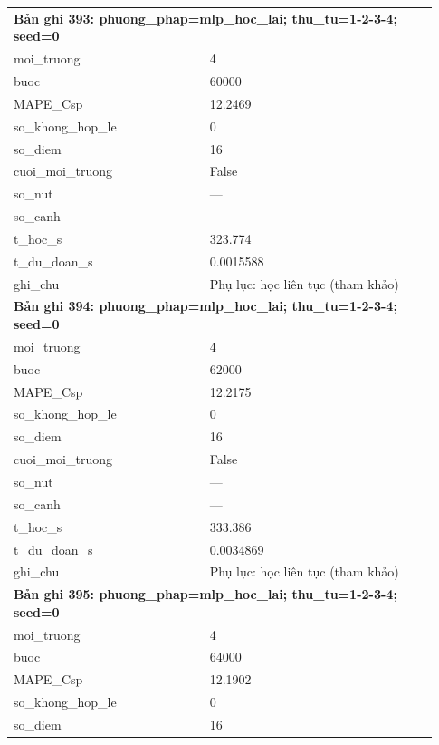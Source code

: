 \begin{longtable}{p{0.43\linewidth}p{0.50\linewidth}}
\midrule
\multicolumn{2}{p{0.95\linewidth}}{\textbf{Bản ghi 393: phuong\_phap=mlp\_hoc\_lai; thu\_tu=1-2-3-4; seed=0}} \\
moi\_\allowbreak truong & 4 \\
buoc & 60000 \\
MAPE\_\allowbreak Csp & 12.2469 \\
so\_\allowbreak khong\_\allowbreak hop\_\allowbreak le & 0 \\
so\_\allowbreak diem & 16 \\
cuoi\_\allowbreak moi\_\allowbreak truong & False \\
so\_\allowbreak nut & — \\
so\_\allowbreak canh & — \\
t\_\allowbreak hoc\_\allowbreak s & 323.774 \\
t\_\allowbreak du\_\allowbreak doan\_\allowbreak s & 0.0015588 \\
ghi\_\allowbreak chu & Phụ lục: học liên tục (tham khảo) \\
\midrule
\multicolumn{2}{p{0.95\linewidth}}{\textbf{Bản ghi 394: phuong\_phap=mlp\_hoc\_lai; thu\_tu=1-2-3-4; seed=0}} \\
moi\_\allowbreak truong & 4 \\
buoc & 62000 \\
MAPE\_\allowbreak Csp & 12.2175 \\
so\_\allowbreak khong\_\allowbreak hop\_\allowbreak le & 0 \\
so\_\allowbreak diem & 16 \\
cuoi\_\allowbreak moi\_\allowbreak truong & False \\
so\_\allowbreak nut & — \\
so\_\allowbreak canh & — \\
t\_\allowbreak hoc\_\allowbreak s & 333.386 \\
t\_\allowbreak du\_\allowbreak doan\_\allowbreak s & 0.0034869 \\
ghi\_\allowbreak chu & Phụ lục: học liên tục (tham khảo) \\
\midrule
\multicolumn{2}{p{0.95\linewidth}}{\textbf{Bản ghi 395: phuong\_phap=mlp\_hoc\_lai; thu\_tu=1-2-3-4; seed=0}} \\
moi\_\allowbreak truong & 4 \\
buoc & 64000 \\
MAPE\_\allowbreak Csp & 12.1902 \\
so\_\allowbreak khong\_\allowbreak hop\_\allowbreak le & 0 \\
so\_\allowbreak diem & 16 \\

\end{longtable}
